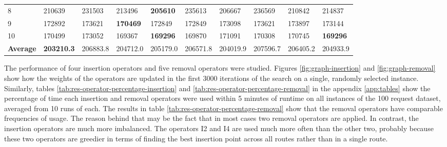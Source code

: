 {\begin{landscape}
{\begin{tabular}{llllllllll}
    8                 & 210639   &    231503   &    213496   &   \textbf{205610}   &    235613   &    206667   &     236569   &     210842   &   214837          \\
    9                 & 172892   &    173621   &    \textbf{170469}   &   172849   &    172849   &    173098   &     173621   &     173897   &   173144          \\
    10                & 170499   &    173052   &    169367   &   \textbf{169296}   &    169870   &    171091   &     170308   &     170745   &   \textbf{169296}          \\ \hline
    \textbf{Average}  & \textbf{203210.3} &    206883.8 &    204712.0 &   205179.0 &    206571.8 &    204019.9 &     207596.7 &     206405.2 &   204933.9
    \end{tabular}}
    \label{tab:parameter-experiments}
    \end{landscape}
    \clearpage
    }

    
    The performance of four insertion operators and five removal operators were studied. Figures \ref{fig:graph-insertion} and \ref{fig:graph-removal} show how the weights of the operators are updated in the first 3000 iterations of the search on a single, randomly selected instance. Similarly, tables \ref{tab:res-operator-percentage-insertion} and \ref{tab:res-operator-percentage-removal} in the appendix \ref{app:tables} show the percentage of time each insertion and removal operators were used within 5 minutes of runtime on all instances of the 100 request dataset, averaged from 10 runs of each. The results in table \ref{tab:res-operator-percentage-removal} show that the removal operators have comparable frequencies of usage. The reason behind that may be the fact that in most cases two removal operators are applied. In contrast, the insertion operators are much more imbalanced. The operators I2 and I4 are used much more often than the other two, probably because these two operators are greedier in terms of finding the best insertion point across all routes rather than in a single route.
    
